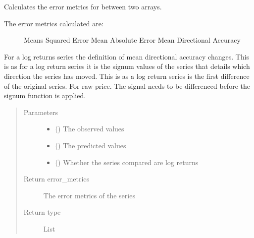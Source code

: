 \documentclass[letterpaper,10pt,english]{sphinxmanual}
\begin{document}

\begin{fulllineitems}
\label{\detokenize{eval_inspect:Foresight.eval_inspect.evaluate}}
Calculates the error metrics for between two arrays.
\begin{description}
\item[{The error metrics calculated are:}] \leavevmode
Means Squared Error
Mean Absolute Error
Mean Directional Accuracy

\end{description}

For a log returns series the definition of mean directional accuracy
changes. This is as for a log return series it is the signum values of the
series that details which direction the series has moved. This is as a log
return series is the first difference of the original series. For raw
price. The signal needs to be differenced before the signum function
is applied.
\begin{quote}\begin{description}
\item[{Parameters}] \leavevmode\begin{itemize}
\item {} 
 () \textendash{} The observed values

\item {} 
 () \textendash{} The predicted values

\item {} 
 () \textendash{} Whether the series compared are log returns

\end{itemize}

\item[{Return error\_metrics}] \leavevmode
The error metrics of the series

\item[{Return type}] \leavevmode
List

\end{description}\end{quote}

\end{fulllineitems}
\end{document}
